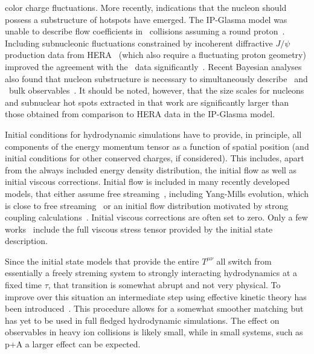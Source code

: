 	color charge fluctuations.
More recently, indications that the nucleon should possess a substructure of hotspots 
  have emerged. 
The IP-Glasma model was unable to describe flow coefficients in \ppb\ 
  collisions assuming a round proton~\cite{Schenke:2014zha}. 
Including subnucleonic fluctuations constrained by incoherent 
  diffractive $J/\psi$ production data from HERA~\cite{Mantysaari:2016ykx} 
	(which also require a fluctuating proton geometry) improved the agreement 
	with the \ppb\ data significantly~\cite{Mantysaari:2017cni}. 
Recent Bayesian analyses also found that nucleon substructure is necessary 
  to simultaneously describe \ppb\ and \pbpb\ bulk observables~\cite{Moreland:2018gsh}.
It should be noted, however, that the size scales for nucleons and subnuclear 
  hot spots extracted in that work are significantly larger than those obtained
	from comparison to HERA data in the IP-Glasma model.

Initial conditions for hydrodynamic simulations have to provide, in principle, 
  all components of the energy momentum tensor as a function of spatial position 
	(and initial conditions for other conserved charges, if considered). 
This includes, apart from the always included energy density distribution, 
  the initial flow as well as initial viscous corrections. 
Initial flow is included in many recently developed models, that either assume 
  free streaming~\cite{Moreland:2018gsh}, including Yang-Mills evolution, which 
	is close to free streaming~\cite{Gale:2012rq} or an initial flow distribution 
	motivated by strong coupling calculations~\cite{Weller:2017tsr}. 
Initial viscous corrections are often set to zero. 
Only a few works~\cite{Mantysaari:2017cni,Schenke:2018fci,Moreland:2018gsh} 
  include the full viscous stress tensor provided by the initial state description.

Since the initial state models that provide the entire $T^{\mu\nu}$ all switch 
  from essentially a freely streming system to strongly interacting hydrodynamics 
	at a fixed time $\tau$, that transition is somewhat abrupt and not very physical. 
To improve over this situation an intermediate step using effective kinetic theory 
  has been introduced~\cite{Kurkela:2018wud,Kurkela:2018vqr}. 
This procedure allows for a somewhat smoother matching but has yet to be used in 
  full fledged hydrodynamic simulations. 
The effect on observables in heavy ion collisions is likely small, while in small 
  systems, such as p+A a larger effect can be expected.

